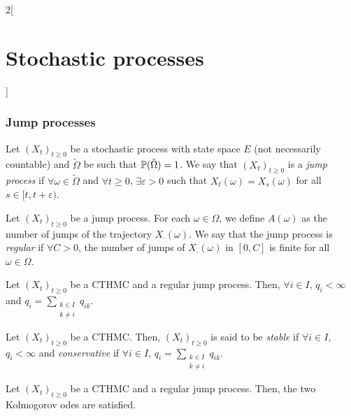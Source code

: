 \documentclass[../../../main_math.tex]{subfiles}
\begin{document}
\begin{multicols}{2}[\section{Stochastic processes}]
  \subsubsection{Jump processes}
  \begin{definition}
    Let ${(X_t)}_{t\geq 0}$ be a stochastic process with state space $E$ (not necessarily countable) and $\tilde\Omega$ be such that $\mathbb{P}(\tilde{\Omega})=1$. We say that ${(X_t)}_{t\geq 0}$ is a \emph{jump process} if $\forall \omega \in \tilde{\Omega}$ and $\forall t\geq 0$, $\exists \varepsilon>0$ such that $X_t(\omega)=X_{s}(\omega)$ for all $s\in[t,t+\varepsilon)$.
  \end{definition}
  \begin{definition}
    Let ${(X_t)}_{t\geq 0}$ be a jump process. For each $\omega\in\Omega$, we define $A(\omega)$ as the number of jumps of the trajectory $X_{\cdot}(\omega)$. We say that the jump process is \emph{regular} if $\forall C>0$, the number of jumps of $X_{\cdot}(\omega)$ in $[0,C]$ is finite for all $\omega\in\Omega$.
  \end{definition}
  \begin{theorem}
    Let ${(X_t)}_{t\geq 0}$ be a CTHMC and a regular jump process. Then, $\forall i\in I$, $q_i<\infty$ and $q_i=\sum_{\substack{k\in I\\k\ne i}}q_{ik}$.
  \end{theorem}
  \begin{definition}
    Let ${(X_t)}_{t\geq 0}$ be a CTHMC. Then, ${(X_t)}_{t\geq 0}$ is said to be \emph{stable} if $\forall i\in I$, $q_i<\infty$ and \emph{conservative} if $\forall i\in I$, $q_i=\sum_{\substack{k\in I\\k\ne i}}q_{ik}$.
  \end{definition}
  \begin{theorem}
    Let ${(X_t)}_{t\geq 0}$ be a CTHMC and a regular jump process. Then, the two Kolmogorov odes are satisfied.
  \end{theorem}

\end{multicols}
\end{document}
